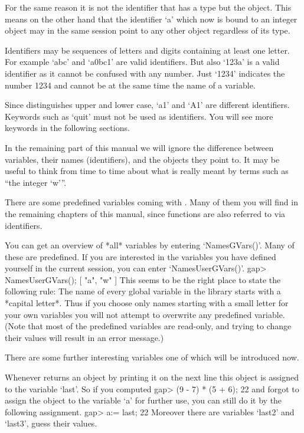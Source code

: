 For the  same reason it is  not the  identifier that has   a type but the
object.  This means  on the other hand that  the identifier `a' which now
is bound to an integer object may in the  same session point to any other
object regardless of its type.

Identifiers  may be sequences  of letters and digits containing at  least
one letter.   For example  `abc' and `a0bc1'  are valid identifiers.  But
also `123a'  is  a valid identifier as  it cannot be  confused  with  any
number.  Just `1234' indicates the  number 1234 and cannot be at the same
time the name of a variable.

Since  {\GAP} distinguishes  upper and  lower  case, `a1'  and  `A1'  are
different  identifiers.   Keywords  such as `quit'  must not  be used  as
identifiers.  You will see more keywords in the following sections.

In  the remaining  part of  this manual   we  will ignore the  difference
between variables, their names  (identifiers), and the objects they point
to.  It may be useful  to think from time  to  time about what is  really
meant by terms such as ``the integer `w'''.

There are some predefined variables coming with {\GAP}.  Many of them you
will find in the remaining  chapters of  this manual, since functions are
also referred to via identifiers.

You    can get   an  overview   of  *all*  {\GAP}   variables by entering
`NamesGVars()'.  Many of these are predefined.  If  you are interested in
the variables you  have defined yourself  in the current {\GAP}  session,
you can enter `NamesUserGVars()'.
\begintt
gap> NamesUserGVars();
[ "a", "w" ]
\endtt
This seems to be the  right place to state the  following rule:
The name of every global variable in the {\GAP} library starts with a
*capital letter*.
Thus if you choose only names starting with a small letter for your own
variables you will not attempt to overwrite any predefined variable.
(Note that most of the predefined variables are read-only,
and trying to change their values will result in an error message.)

There are some further interesting variables one of which will be
introduced now.

Whenever {\GAP} returns an object by printing it  on  the next  line this
object is assigned to the variable `last'.  So if you computed
\beginexample
gap> (9 - 7) * (5 + 6);
22 
\endexample
and forgot to assign the object to the  variable `a' for further use, you
can still do it by the following assignment.
\beginexample
gap> a:= last;
22 
\endexample
Moreover there are variables `last2' and `last3', guess their values.

